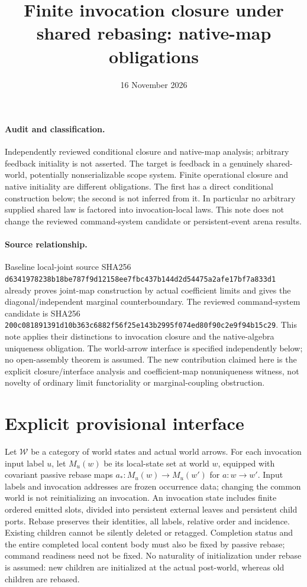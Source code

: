 \documentclass[11pt]{article}
\title{Finite invocation closure under shared rebasing: native-map obligations}
\date{16 November 2026}
\begin{document}
\maketitle
\paragraph{Audit and classification.} Independently reviewed conditional closure and native-map analysis; arbitrary feedback initiality is not asserted. The target is feedback in a genuinely shared-world, potentially nonserializable scope system. Finite operational closure and native initiality are different obligations. The first has a direct conditional construction below; the second is not inferred from it. In particular no arbitrary supplied shared law is factored into invocation-local laws. This note does not change the reviewed command-system candidate or persistent-event arena results.

\paragraph{Source relationship.} Baseline local-joint source SHA256
\texttt{d6341978238b18be787f9d12158ee7fbc437b144d2d54475a2afe17bf7a833d1}
already proves joint-map construction by actual coefficient limits and gives the diagonal/independent marginal counterboundary. The reviewed command-system candidate is SHA256
\texttt{200c081891391d10b363c6882f56f25e143b2995f074ed80f90c2e9f94b15c29}.
This note applies their distinctions to invocation closure and the native-algebra uniqueness obligation. The world-arrow interface is specified independently below; no open-assembly theorem is assumed. The new contribution claimed here is the explicit closure/interface analysis and coefficient-map nonuniqueness witness, not novelty of ordinary limit functoriality or marginal-coupling obstruction.

\section{Explicit provisional interface}
Let $\mathcal W$ be a category of world states and actual world arrows. For each invocation input label $u$, let $M_u(w)$ be its local-state set at world $w$, equipped with covariant passive rebase maps $a_*:M_u(w)\to M_u(w')$ for $a:w\to w'$. Input labels and invocation addresses are frozen occurrence data; changing the common world is not reinitializing an invocation. An invocation state includes finite ordered emitted slots, divided into persistent external leaves and persistent child ports. Rebase preserves their identities, all labels, relative order and incidence. Existing children cannot be silently deleted or retagged. Completion status and the entire completed local content body must also be fixed by passive rebase; command readiness need not be fixed. No naturality of initialization under rebase is assumed: new children are initialized at the actual post-world, whereas old children are rebased.
\end{document}

